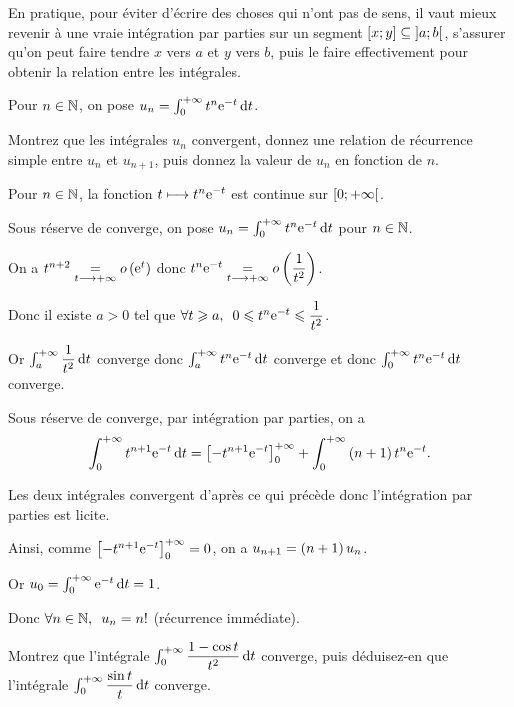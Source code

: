 En pratique, pour éviter d'écrire des choses qui n'ont pas de sens, il vaut mieux revenir à une vraie intégration par parties sur un segment \(\left[x;y\right]\subseteq\left]a;b\right[\), s'assurer qu'on peut faire tendre \(x\) vers \(a\) et \(y\) vers \(b\), puis le faire effectivement pour obtenir la relation entre les intégrales.

\begin{exo}
Pour \(n\in\mathbb{N}\), on pose \(u_n=\int_0^{\pinf}t^n\e{-t}\odif{t}\).

Montrez que les intégrales \(u_n\) convergent, donnez une relation de récurrence simple entre \(u_n\) et \(u_{n+1}\), puis donnez la valeur de \(u_n\) en fonction de \(n\).
\end{exo}

\begin{corr}
Pour \(n\in\mathbb{N}\), la fonction \(t\longmapsto t^n\mathrm{e}^{-t}\) est continue sur \(\left[0;+\infty\right[\).

Sous réserve de converge, on pose \(u_n=\int_0^{\pinf}t^n\e{-t}\odif{t}\) pour \(n\in\mathbb{N}\).

On a \(t^{n+2}\underset{t\longrightarrow+\infty}{=}o\left(\mathrm{e}^{t}\right)\) donc \(t^n\mathrm{e}^{-t}\underset{t\longrightarrow+\infty}{=}o\left(\dfrac{1}{t^2}\right)\).

Donc il existe \(a>0\) tel que \(\quantifs{\forall t\geq a}0\leq t^n\e{-t}\leq\dfrac{1}{t^2}\).

Or \(\int_a^{\pinf}\dfrac{1}{t^2}\odif{t}\) converge donc \(\int_a^{\pinf}t^n\e{-t}\odif{t}\) converge et donc \(\int_0^{\pinf}t^n\e{-t}\odif{t}\) converge.

Sous réserve de converge, par intégration par parties, on a \[\int_0^{\pinf}t^{n+1}\e{-t}\odif{t}=\croch{-t^{n+1}\e{-t}}_0^{\pinf}+\int_0^{\pinf}\paren{n+1}t^n\e{-t}.\]

Les deux intégrales convergent d'après ce qui précède donc l'intégration par parties est licite.

Ainsi, comme \(\left[-t^{n+1}\mathrm{e}^{-t}\right]_0^{+\infty}=0\), on a \(u_{n+1}=\left(n+1\right)u_n\).

Or \(u_0=\int_0^{\pinf}\e{-t}\odif{t}=1\).

Donc \(\quantifs{\forall n\in\N}u_n=n!\) (récurrence immédiate).
\end{corr}

\begin{exo}
Montrez que l'intégrale \(\int_0^{\pinf}\dfrac{1-\cos t}{t^2}\odif{t}\) converge, puis déduisez-en que l'intégrale \(\int_0^{\pinf}\dfrac{\sin t}{t}\odif{t}\) converge.
\end{exo}

